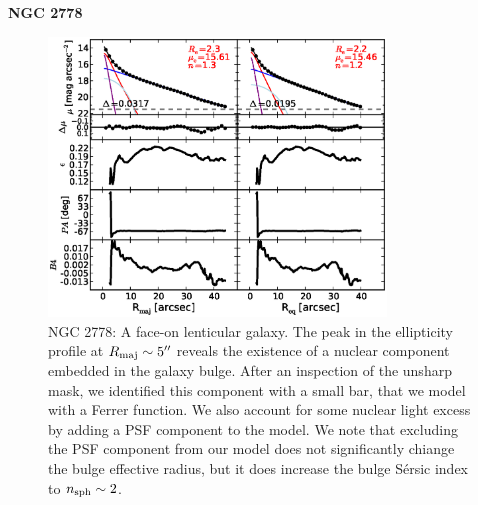 \documentclass[preprint2]{emulateapj}
\newcommand{\fitfigurewidth}{0.8\textwidth}
\begin{document}
  \clearpage\newpage\noindent
  {\bf NGC 2778 \\}

  \begin{figure}[h]
  \begin{center}
  \includegraphics[width=\fitfigurewidth]{images/n2778_1Dfit.eps}
  \caption{NGC 2778: 
  A face-on lenticular galaxy. 
  The peak in the ellipticity profile at $R_{\rm maj} \sim 5''$ reveals the existence of a nuclear component 
  embedded in the galaxy bulge.
  After an inspection of the unsharp mask, we identified this component with a small bar,
  that we model with a Ferrer function.
  We also account for some nuclear light excess by adding a PSF component to the model.
  We note that excluding the PSF component from our model does not significantly chiange the 
  bulge effective radius, but it does increase the bulge S\'ersic index to $n_{\rm sph} \sim 2$.
  }
  \end{center}
  \end{figure}
\end{document}
